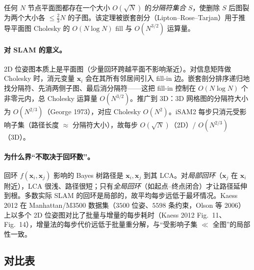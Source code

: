 \begin{theorem}
\label{thm:planar-separator}
任何 $N$ 节点平面图都存在一个大小 $O(\sqrt N)$ 的\emph{分隔符集合} $S$，使删除 $S$ 后图裂为两个大小各 $\le\tfrac23 N$ 的子图。该定理被嵌套剖分（Lipton--Rose--Tarjan\cite{lipton1979generalized}）用于推导平面图 Cholesky 的 $O(N\log N)$ fill 与 $O(N^{3/2})$ 运算量。
\end{theorem}

\paragraph{对 SLAM 的意义。}
2D 位姿图本质上是平面图（少量回环跨越平面不影响渐近）。对信息矩阵做 Cholesky 时，消元变量 $\mathbf{x}_i$ 会在其所有邻居间引入 fill-in 边。嵌套剖分排序递归地找分隔符、先消两侧子图、最后消分隔符——这把 fill-in 控制在 $O(N\log N)$ 个非零元内，总 Cholesky 运算量 $O(N^{3/2})$。推广到 3D：3D 网格图的分隔符大小为 $O(N^{2/3})$（George 1973\cite{george1973nested}），对应 Cholesky $O(N^2)$。iSAM2 每步只消元受影响子集（路径长度 $\approx$ 分隔符大小），故每步 $O(\sqrt N)$（2D）/ $O(N^{2/3})$（3D）。

\paragraph{为什么界“不取决于回环数”。}
回环 $f(\mathbf{x}_i,\mathbf{x}_j)$ 影响的 Bayes 树路径是 $\mathbf{x}_i,\mathbf{x}_j$ 到其 LCA。对\emph{局部回环}（$\mathbf{x}_j$ 在 $\mathbf{x}_i$ 附近），LCA 很浅、路径很短；只有\emph{全局回环}（如起点--终点闭合）才让路径延伸到根。多数实际 SLAM 的回环是局部的，故平均每步远低于最坏情况。Kaess 2012 在 Manhattan/M3500 数据集（$3500$ 位姿、$5598$ 条约束，Olson 等 2006）上以多个 2D 位姿图对比了批量与增量的每步耗时（Kaess 2012 Fig.~11、Fig.~14\cite{kaess2012isam2}），增量法的每步代价远低于批量重分解，与“受影响子集 $\ll$ 全图”的局部性一致。

\subsection{对比表}
\label{sec:isam-complexity-table}


